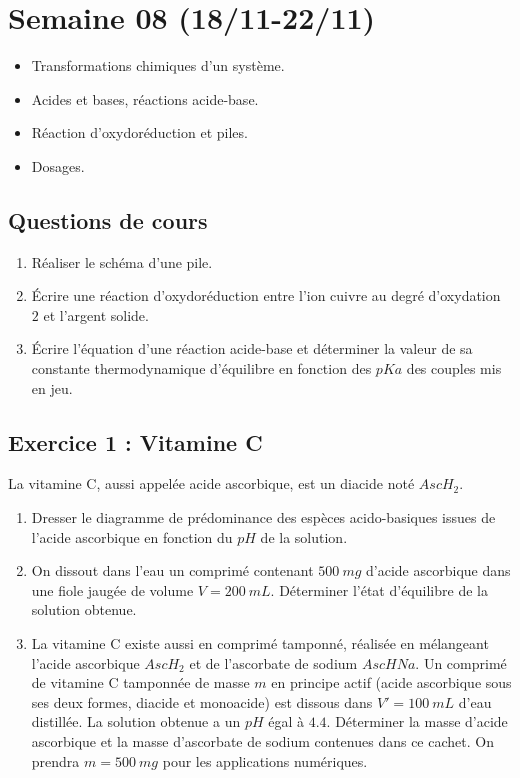 \section{Semaine 08 (18/11-22/11) }


\begin{itemize}
	\item Transformations chimiques d'un système.
	\item Acides et bases, réactions acide-base.
	\item Réaction d'oxydoréduction et piles.
	\item Dosages.
\end{itemize}

\subsection{Questions de cours}

\begin{enumerate}
	\item Réaliser le schéma d'une pile. 
	\item Écrire une réaction d'oxydoréduction entre l'ion cuivre au degré d'oxydation $2$ et l'argent solide.
	\item Écrire l'équation d'une réaction acide-base et déterminer la valeur de sa constante thermodynamique d'équilibre en fonction des $pKa$ des couples mis en jeu.
\end{enumerate}

\subsection{Exercice 1 : Vitamine C}

La vitamine C, aussi appelée acide ascorbique, est un diacide noté $AscH_2$.

\begin{enumerate}
	\item Dresser le diagramme de prédominance des espèces acido-basiques issues de l'acide ascorbique en fonction du $pH$ de la solution.
	\item On dissout dans l'eau un comprimé contenant $\SI{500}{mg}$ d'acide ascorbique dans une fiole jaugée de volume $V = \SI{200}{mL}$. Déterminer l'état d'équilibre de la solution obtenue.
	\item La vitamine C existe aussi en comprimé tamponné, réalisée en mélangeant l'acide ascorbique $AscH_2$ et de l'ascorbate de sodium $AscHNa$. Un comprimé de vitamine C tamponnée de masse $m$ en principe actif (acide ascorbique sous ses deux formes, diacide et monoacide) est dissous dans $V'=\SI{100}{mL}$ d'eau distillée. La solution obtenue a un $pH$ égal à $4.4$. Déterminer la masse d'acide ascorbique et la masse d'ascorbate de sodium contenues dans ce cachet. On prendra $m=\SI{500}{mg}$ pour les applications numériques.
\end{enumerate}

